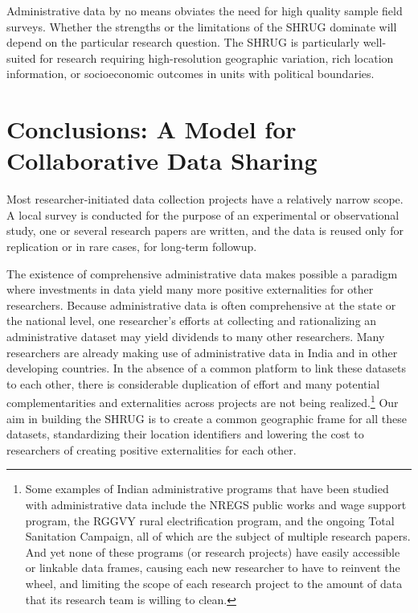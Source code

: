 \documentclass[12pt,letterpaper]{article}
\begin{document}
Administrative data by no means obviates the need for high quality
sample field surveys. Whether the strengths or the limitations of the
SHRUG dominate will depend on the particular research question. The
SHRUG is particularly well-suited for research requiring
high-resolution geographic variation, rich location information, or
socioeconomic outcomes in units with political boundaries.

\section{Conclusions: A Model for Collaborative Data Sharing}
\label{sec:conc}

Most researcher-initiated data collection projects have a relatively
narrow scope. A local survey is conducted for the purpose of an
experimental or observational study, one or several research papers
are written, and the data is reused only for replication or in rare
cases, for long-term followup.

The existence of comprehensive administrative data makes possible a
paradigm where investments in data yield many more positive
externalities for other researchers. Because administrative data is
often comprehensive at the state or the national level, one
researcher's efforts at collecting and rationalizing an administrative
dataset may yield dividends to many other researchers. Many
researchers are already making use of administrative data in India and
in other developing countries. In the absence of a common platform to
link these datasets to each other, there is considerable duplication
of effort and many potential complementarities and externalities
across projects are not being realized.\footnote{Some examples of
  Indian administrative programs that have been studied with
  administrative data include the NREGS public works and wage support
  program, the RGGVY rural electrification program, and the ongoing
  Total Sanitation Campaign, all of which are the subject of multiple
  research papers. And yet none of these programs (or research
  projects) have easily accessible or linkable data frames, causing
  each new researcher to have to reinvent the wheel, and limiting the
  scope of each research project to the amount of data that its
  research team is willing to clean.}  Our aim in building the SHRUG
is to create a common geographic frame for all these datasets,
standardizing their location identifiers and lowering the cost to
researchers of creating positive externalities for each other.
\end{document}
